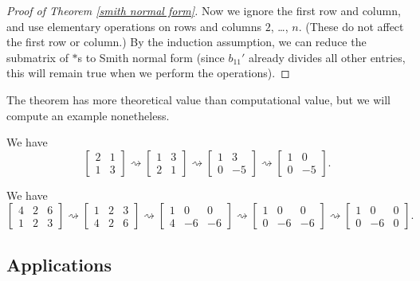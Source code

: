 \begin{proof}[Proof of Theorem \ref{smith normal form}]
Now we ignore the first row and column, and use elementary operations on rows and columns $2$, \ldots, $n$. (These do not affect the first row or column.) By the induction assumption, we can reduce the submatrix of $*$s to Smith normal form (since $b_{11}'$ already divides all other entries, this will remain true when we perform the operations). 
\end{proof}

The theorem has more theoretical value than computational value, but we will compute an example nonetheless.
\begin{example}
We have 
\[
\begin{bmatrix}
2 & 1 \\ 1 & 3
\end{bmatrix}  \rightsquigarrow\begin{bmatrix}
1 & 3 \\ 2 & 1
\end{bmatrix}\rightsquigarrow \begin{bmatrix}
1 & 3 \\ 0 & -5
\end{bmatrix} \rightsquigarrow\begin{bmatrix}
1 & 0 \\ 0 & -5
\end{bmatrix}.
\]
\end{example}

\begin{example}
We have 
\[
\begin{bmatrix}
4 & 2 & 6 \\ 1 & 2 & 3
\end{bmatrix}  \rightsquigarrow\begin{bmatrix}
1 & 2 & 3 \\ 4 & 2 & 6
\end{bmatrix}\rightsquigarrow \begin{bmatrix}
1 & 0 & 0\\ 4 & -6 & -6
\end{bmatrix} \rightsquigarrow\begin{bmatrix}
1 & 0 & 0 \\ 0 & -6 &  -6
\end{bmatrix} \rightsquigarrow\begin{bmatrix}
1 & 0 & 0 \\ 0 & -6 &  0
\end{bmatrix}.
\]
\end{example}

\subsection{Applications}

